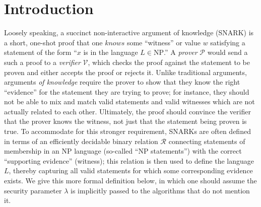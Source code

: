 \section{Introduction}
\noindent Loosely speaking, a succinct non-interactive argument of knowledge (SNARK) is a short, one-shot proof that one $knows$ some ``witness'' or value $w$ satisfying a statement of the form ``$x$ is in the language $L \in \text{NP}$.'' A \textit{prover} $\mathcal{P}$ would send a such a proof to a \textit{verifier} $\mathcal{V}$, which checks the proof against the statement to be proven and either accepts the proof or rejects it. Unlike traditional arguments, arguments \textit{of knowledge} require the prover to show that they know the right ``evidence'' for the statement they are trying to prove; for instance, they should not be able to mix and match valid statements and valid witnesses which are not actually related to each other. Ultimately, the proof should convince the verifier that the prover knows the witness, not just that the statement being proven is true. To accommodate for this stronger requirement, SNARKs are often defined in terms of an efficiently decidable binary relation $\mathcal{R}$ connecting statements of membership in an NP language (so-called ``NP statements'') with the correct ``supporting evidence'' (witness); this relation is then used to define the language $L$, thereby capturing all valid statements for which some corresponding evidence exists. We give this more formal definition below, in which one should assume the security parameter $\lambda$ is implicitly passed to the algorithms that do not mention it.

